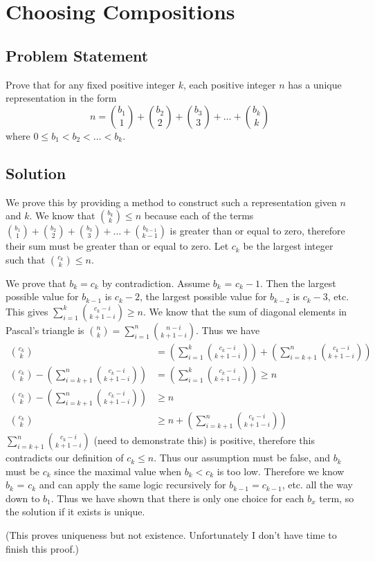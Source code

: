 \documentclass[12pt]{article}
\newcommand{\ProblemStatement}[1]{
\subsection*{Problem Statement}
#1
\subsection*{Solution}
}
\begin{document}
\section{Choosing Compositions}
\ProblemStatement{
Prove that for any fixed positive integer $k$, each positive integer $n$ has a unique representation in the form 
\[
    n = \binom{b_1}{1} + \binom{b_2}{2} + \binom{b_3}{3} +\dots + \binom{b_k}{k} 
\]
where $0 \le b_1 < b_2 < \dots < b_k$.
}

We prove this by providing a method to construct such a representation given $n$ and $k$.
We know that $\binom{b_k}{k} \le n$ because each of the terms $\binom{b_1}{1} + \binom{b_2}{2} + \binom{b_3}{3} +\dots + \binom{b_{k-1}}{k-1}$ is greater than or equal to zero, therefore their sum must be greater than or equal to zero. Let $c_k$ be the largest integer such that $\binom{c_k}{k} \le n$. 

We prove that $b_k = c_k$ by contradiction. Assume $b_k$ = $c_k - 1$. Then the largest possible value for $b_{k-1}$ is $c_k-2$, the largest possible value for $b_{k-2}$ is $c_k-3$, etc. This gives $\sum_{i=1}^{k} \binom{c_k-i}{k+1-i} \ge n$. We know that the sum of diagonal elements in Pascal's triangle is $\binom{n}{k} = \sum_{i=1}^{n} \binom{n-i}{k+1-i}$. Thus we have
\begin{align*}
    \binom{c_k}{k} &= \left(\sum_{i=1}^{k} \binom{c_k-i}{k+1-i}\right)+\left(\sum_{i=k+1}^{n} \binom{c_k-i}{k+1-i}\right)\\
    \binom{c_k}{k} - \left(\sum_{i=k+1}^{n} \binom{c_k-i}{k+1-i}\right)&= \left(\sum_{i=1}^{k} \binom{c_k-i}{k+1-i}\right) \ge n\\
    \binom{c_k}{k} - \left(\sum_{i=k+1}^{n} \binom{c_k-i}{k+1-i}\right)&\ge n\\
    \binom{c_k}{k} &\ge n + \left(\sum_{i=k+1}^{n} \binom{c_k-i}{k+1-i}\right)
\end{align*}
$\sum_{i=k+1}^{n} \binom{c_k-i}{k+1-i}$ (need to demonstrate this) is positive, therefore this contradicts our definition of $c_k \le n$. Thus our assumption must be false, and $b_k$ must be $c_k$ since the maximal value when $b_k < c_k$ is too low. Therefore we know $b_k$ = $c_k$ and can apply the same logic recursively for $b_{k-1} = c_{k-1}$, etc. all the way down to $b_1$. Thus we have shown that there is only one choice for each $b_x$ term, so the solution if it exists is unique.

(This proves uniqueness but not existence. Unfortunately I don't have time to finish this proof.) 
\end{document}
